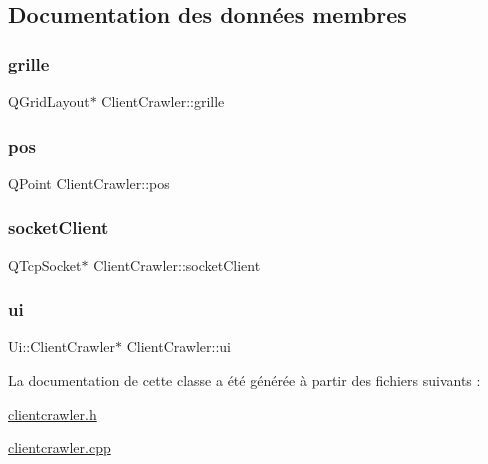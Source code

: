 \subsection{Documentation des données membres}
\mbox{\label{class_client_crawler_ac32bb3ac1812334a2232d462f65e28d2}} 
\subsubsection{\texorpdfstring{grille}{grille}}
{\footnotesize\ttfamily Q\+Grid\+Layout$\ast$ Client\+Crawler\+::grille\hspace{0.3cm}{\ttfamily [private]}}

\mbox{\label{class_client_crawler_a0cf23901bc90495a8ca6fcdff7a31379}} 
\subsubsection{\texorpdfstring{pos}{pos}}
{\footnotesize\ttfamily Q\+Point Client\+Crawler\+::pos}

\mbox{\label{class_client_crawler_a7796ea05089d10bd1c5a6158b8cd8c89}} 
\subsubsection{\texorpdfstring{socket\+Client}{socketClient}}
{\footnotesize\ttfamily Q\+Tcp\+Socket$\ast$ Client\+Crawler\+::socket\+Client\hspace{0.3cm}{\ttfamily [private]}}

\mbox{\label{class_client_crawler_a6263947f12b0ca34753f4cbb43d6d4fd}} 
\subsubsection{\texorpdfstring{ui}{ui}}
{\footnotesize\ttfamily Ui\+::\+Client\+Crawler$\ast$ Client\+Crawler\+::ui\hspace{0.3cm}{\ttfamily [private]}}



La documentation de cette classe a été générée à partir des fichiers suivants \+:\begin{DoxyCompactItemize}
\item 
\hyperlink{clientcrawler_8h}{clientcrawler.\+h}\item 
\hyperlink{clientcrawler_8cpp}{clientcrawler.\+cpp}\end{DoxyCompactItemize}

